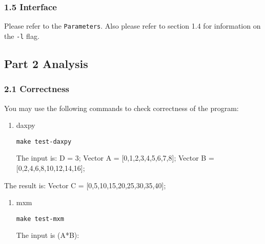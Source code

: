 \documentclass[11pt]{article}
\begin{document}
\subsubsection{1.5 Interface}\label{interface}

Please refer to the \texttt{Parameters}. Also please refer to section
1.4 for information on the \texttt{-l} flag.

    \subsection{Part 2 Analysis}\label{part-2-analysis}

\subsubsection{2.1 Correctness}\label{correctness}

You may use the following commands to check correctness of the program:

\begin{enumerate}
\def\labelenumi{(\arabic{enumi})}
\item
  daxpy

\begin{verbatim}
make test-daxpy
\end{verbatim}

  The input is: D = 3; Vector A = {[}0,1,2,3,4,5,6,7,8{]}; Vector B =
  {[}0,2,4,6,8,10,12,14,16{]};
\end{enumerate}

The result is: Vector C = {[}0,5,10,15,20,25,30,35,40{]};

\begin{enumerate}
\def\labelenumi{(\arabic{enumi})}
\setcounter{enumi}{1}
\item
  mxm

\begin{verbatim}
make test-mxm
\end{verbatim}

  The input is (A*B):
\end{enumerate}
\end{document}

